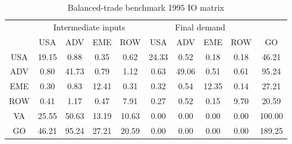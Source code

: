 \begin{table}[p]
\begin{center}
\caption{Balanced-trade benchmark 1995 IO matrix}
\label{tab:iomat-bal-bench-1995}
\small
\begin{tabular}{cccccccccc}
\toprule
& \multicolumn{4}{c}{Intermediate inputs}& \multicolumn{4}{c}{Final demand} & \\
\cmidrule(rl){2-5}\cmidrule(rl){6-9}
 &USA &ADV &EME &ROW &USA &ADV &EME &ROW& GO\\
\midrule
USA& 19.15& 0.88& 0.35& 0.62& 24.33& 0.52& 0.18& 0.18& 46.21 \\
ADV& 0.80& 41.73& 0.79& 1.12& 0.63& 49.06& 0.51& 0.61& 95.24 \\
EME& 0.30& 0.83& 12.41& 0.31& 0.32& 0.54& 12.35& 0.14& 27.21 \\
ROW& 0.41& 1.17& 0.47& 7.91& 0.27& 0.52& 0.15& 9.70& 20.59 \\
\midrule
VA& 25.55& 50.63& 13.19& 10.63& 0.00& 0.00& 0.00& 0.00& 100.00\\
\midrule
GO& 46.21& 95.24& 27.21& 20.59& 0.00& 0.00& 0.00& 0.00& 189.25\\
\bottomrule
\end{tabular}
\normalsize
\end{center}
\end{table}
